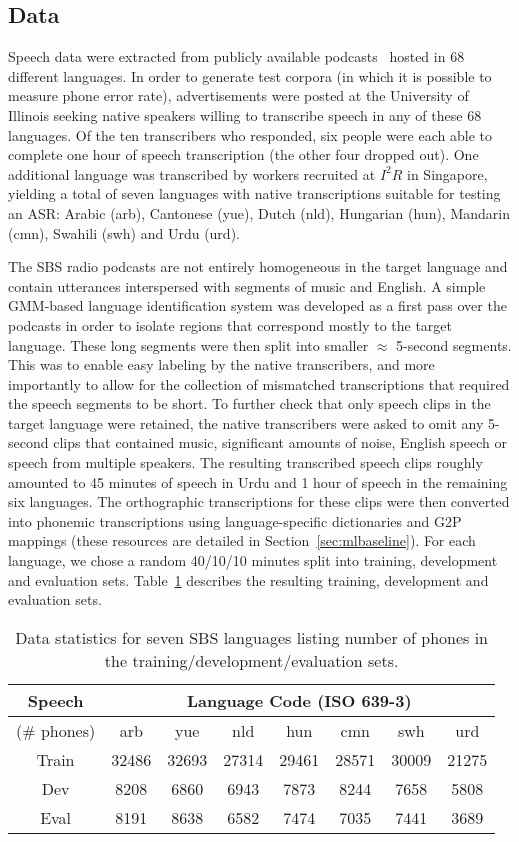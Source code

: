 \subsection{Data}
\label{sec:data}

Speech data were extracted from publicly available podcasts~\cite{SBS}
hosted in 68 different languages.  In order to generate test corpora
(in which it is possible to measure phone error rate), advertisements
were posted at the University of Illinois seeking native speakers
willing to transcribe speech in any of these 68 languages.  Of the ten
transcribers who responded, six people were each able to complete one
hour of speech transcription (the other four dropped out).  One
additional language was transcribed by workers recruited at $I^2R$ in
Singapore, yielding a total of seven languages with native
transcriptions suitable for testing an ASR: Arabic (arb), Cantonese
(yue), Dutch (nld), Hungarian (hun), Mandarin (cmn), Swahili (swh) and
Urdu (urd).

The SBS radio podcasts are not entirely homogeneous in the target
language and contain utterances interspersed with segments of music
and English. A simple GMM-based language identification system was
developed as a first pass over the podcasts in order to isolate
regions that correspond mostly to the target language. These long
segments were then split into smaller $\approx$ 5-second
segments. This was to enable easy labeling by the native transcribers,
and more importantly to allow for the collection of mismatched
transcriptions that required the speech segments to be short. To
further check that only speech clips in the target language were
retained, the native transcribers were asked to omit any 5-second
clips that contained music, significant amounts of noise, English
speech or speech from multiple speakers. The resulting transcribed
speech clips roughly amounted to 45 minutes of speech in Urdu and 1
hour of speech in the remaining six languages. The orthographic
transcriptions for these clips were then converted into phonemic
transcriptions using language-specific dictionaries and G2P mappings
(these resources are detailed in Section~\ref{sec:mlbaseline}). For
each language, we chose a random 40/10/10 minutes split into training,
development and evaluation sets.  Table~\ref{tab:data} describes the
resulting training, development and evaluation sets.
\begin{table}[t]
\centering
\begin{tabular}{|c||c|c|c|c|c|c|c|}\hline
Speech  & \multicolumn{7}{|c|}{Language Code (ISO 639-3)}\\\hline
(\# phones) & arb & yue & nld & hun & cmn & swh & urd \\ \hline\hline
Train & 32486 & 32693 & 27314 & 29461 & 28571 & 30009 & 21275 \\
Dev & 8208 & 6860 & 6943 & 7873 & 8244 & 7658 & 5808 \\
Eval & 8191 & 8638 & 6582 & 7474 & 7035 & 7441 & 3689 \\\hline
\end{tabular}
\caption{Data statistics for seven SBS languages listing number of phones in the training/development/evaluation sets.}
\label{tab:data}
\end{table}
